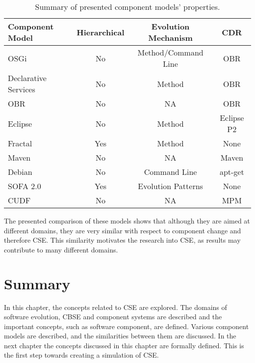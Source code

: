 \begin{table}
\begin{tabular}{|l || c | c | c | }
\hline \textbf{Component Model}& \textbf{Hierarchical}& \textbf{Evolution Mechanism}	& \textbf{CDR}\\\hline

OSGi					& No			& Method/Command Line 					& OBR\\
Declarative Services	& No			& Method 								& OBR\\
OBR						& No			& NA									& OBR \\
Eclipse					& No			& Method								& Eclipse P2\\
Fractal					& Yes			& Method 								& None\\
Maven					& No			& NA 									& Maven\\
Debian					& No			& Command Line 							& apt-get\\
SOFA 2.0				& Yes			& Evolution Patterns 					& None\\
CUDF					& No			& NA 									& MPM\\\hline
\end{tabular}
\caption{Summary of presented component models' properties.}
\label{background.comparisonprop}
\end{table}

The presented comparison of these models shows that although they are aimed at different domains, they are very similar with respect to component change and therefore CSE.
This similarity motivates the research into CSE, as results may contribute to many different domains. 

\section{Summary}
In this chapter, the concepts related to CSE are explored.
The domains of software evolution, CBSE and component systems are described and the important concepts, such as software component, are defined.
Various component models are described, and the similarities between them are discussed.
In the next chapter the concepts discussed in this chapter are formally defined. 
This is the first step towards creating a simulation of CSE.


